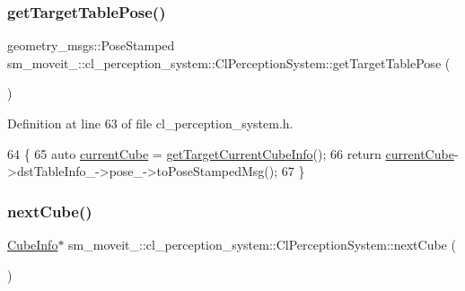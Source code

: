 \subsubsection{\texorpdfstring{get\+Target\+Table\+Pose()}{getTargetTablePose()}}
{\footnotesize\ttfamily geometry\+\_\+msgs\+::\+Pose\+Stamped sm\+\_\+moveit\+\_\+::cl\+\_\+perception\+\_\+system\+::\+Cl\+Perception\+System\+::get\+Target\+Table\+Pose (\begin{DoxyParamCaption}{ }\end{DoxyParamCaption})\hspace{0.3cm}{\ttfamily [inline]}}



Definition at line 63 of file cl\+\_\+perception\+\_\+system.\+h.


\begin{DoxyCode}
64             \{
65                 \textcolor{keyword}{auto} \hyperlink{classsm__moveit__4_1_1cl__perception__system_1_1ClPerceptionSystem_ae2a80b803814af8b3c87f810f2728af0}{currentCube} = \hyperlink{classsm__moveit__4_1_1cl__perception__system_1_1ClPerceptionSystem_ac4b944cebb2055a85a33129665df5dcf}{getTargetCurrentCubeInfo}();
66                 \textcolor{keywordflow}{return} \hyperlink{classsm__moveit__4_1_1cl__perception__system_1_1ClPerceptionSystem_ae2a80b803814af8b3c87f810f2728af0}{currentCube}->dstTableInfo\_->pose\_->toPoseStampedMsg();
67             \}
\end{DoxyCode}
\mbox{\label{classsm__moveit__4_1_1cl__perception__system_1_1ClPerceptionSystem_ab9ee8563cf55a88b34e81a2281da996f}} 
\subsubsection{\texorpdfstring{next\+Cube()}{nextCube()}}
{\footnotesize\ttfamily \hyperlink{structsm__moveit__4_1_1cl__perception__system_1_1CubeInfo}{Cube\+Info}$\ast$ sm\+\_\+moveit\+\_\+::cl\+\_\+perception\+\_\+system\+::\+Cl\+Perception\+System\+::next\+Cube (\begin{DoxyParamCaption}{ }\end{DoxyParamCaption})\hspace{0.3cm}{\ttfamily [inline]}}



